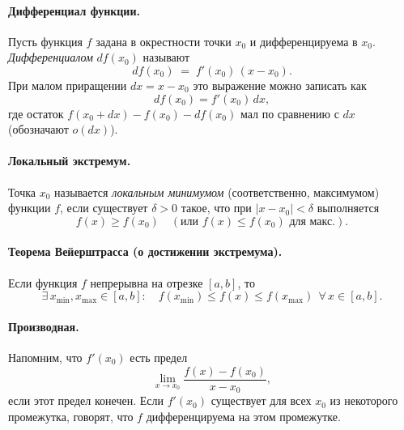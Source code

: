 
\paragraph{Дифференциал функции.}
Пусть функция $f$ задана в окрестности точки $x_0$ и дифференцируема в $x_0$.
\emph{Дифференциалом} $df(x_0)$ называют
\[
	df(x_0) \;=\; f'(x_0)\,(x - x_0).
\]
При малом приращении $dx = x - x_0$ это выражение можно записать как
\[
	df(x_0) = f'(x_0)\,dx,
\]
где остаток $f(x_0 + dx) - f(x_0) - df(x_0)$ мал по сравнению с $dx$ (обозначают $o(dx)$).

\bigskip

\paragraph{Локальный экстремум.}
Точка $x_0$ называется \emph{локальным минимумом} (соответственно, максимумом) функции $f$,
если существует $\delta>0$ такое, что при $|x - x_0| < \delta$ выполняется
\[
	f(x) \ge f(x_0)\quad (\text{или } f(x) \le f(x_0) \text{ для макс.}).
\]

\bigskip

\paragraph{Теорема Вейерштрасса (о достижении экстремума).}
Если функция $f$ непрерывна на отрезке $[a,b]$, то
\[
	\exists\, x_{\min}, x_{\max}\in [a,b] :
	\quad f(x_{\min}) \le f(x) \le f(x_{\max}) \ \ \forall\,x\in [a,b].
\]

\bigskip

\paragraph{Производная.}
Напомним, что $f'(x_0)$ есть предел
\[
	\lim_{x \to x_0}\frac{f(x) - f(x_0)}{\,x - x_0\,},
\]
если этот предел конечен. Если $f'(x_0)$ существует для всех $x_0$ из некоторого промежутка,
говорят, что $f$ дифференцируема на этом промежутке.
